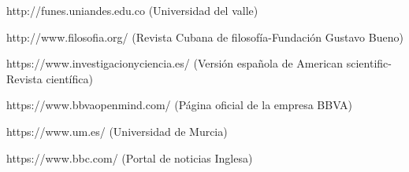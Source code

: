 \documentclass[11pt]{article}
\begin{document}
\medskip

 
http://funes.uniandes.edu.co (Universidad del valle)

http://www.filosofia.org/ (Revista Cubana de filosofía-Fundación Gustavo Bueno)

https://www.investigacionyciencia.es/ (Versión española de American scientific-Revista científica)

https://www.bbvaopenmind.com/ (Página oficial de la empresa BBVA)

https://www.um.es/ (Universidad de Murcia)

https://www.bbc.com/ (Portal de noticias Inglesa)
\end{document}
